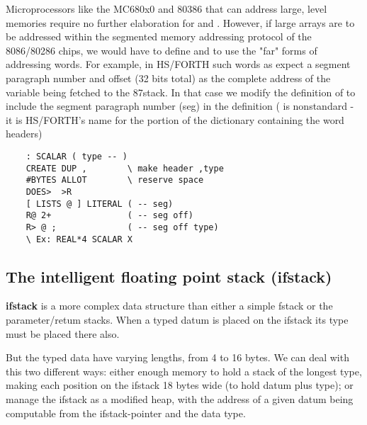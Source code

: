 Microprocessors like the MC680x0 and 80386 that can address large, level memories require no further elaboration for  and . However, if large arrays are to be addressed within the segmented memory addressing protocol of the 8086/80286 chips, we would have to define  and  to use the "far" forms of addressing words. For example, in HS/FORTH such words as  expect a segment paragraph number and offset (32 bits total) as the complete address of the variable being fetched to the 87stack. In that case we modify the definition of  to include the segment paragraph number (seg) in the definition ( is nonstandard - it is HS/FORTH's name for the portion of the dictionary containing the word headers)

\begin{lstlisting}
    : SCALAR ( type -- )
    CREATE DUP ,        \ make header ,type
    #BYTES ALLOT        \ reserve space
    DOES>  >R
    [ LISTS @ ] LITERAL ( -- seg)
    R@ 2+               ( -- seg off)
    R> @ ;              ( -- seg off type)
    \ Ex: REAL*4 SCALAR X
\end{lstlisting}

\subsection{The intelligent floating point stack (ifstack)}
 \textbf{ifstack} is a more complex data structure than either a simple fstack or the parameter/retum stacks. When a typed datum is placed on the ifstack its type must be placed there also.

But the typed data have varying lengths, from 4 to 16 bytes. We can deal with this two different ways: either  enough memory to hold a stack of the longest type, making each position on the ifstack 18 bytes wide (to hold datum plus type); or manage the ifstack as a modified heap, with the address of a given datum being computable from the ifstack-pointer and the data type.

